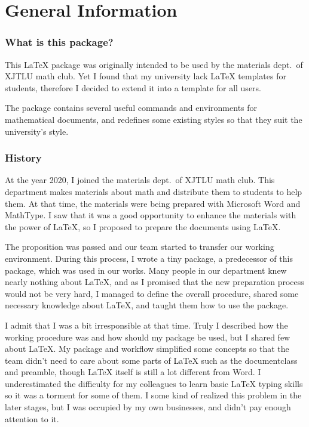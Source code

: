 \part{General Information}
\pagestyle{headings}
\section{What is this package?}
This \LaTeX{} package was originally intended to be used by the materials dept.~of XJTLU math club. Yet I found that my university lack \LaTeX{} templates for students, therefore I decided to extend it into a template for all users.

The package contains several useful commands and environments for mathematical documents, and redefines some existing styles so that they suit the university's style.

\section{History}
At the year 2020, I joined the materials dept.~of XJTLU math club. This department makes materials about math and distribute them to students to help them. At that time, the materials were being prepared with Microsoft Word and MathType. I saw that it was a good opportunity to enhance the materials with the power of \LaTeX, so I proposed to prepare the documents using \LaTeX.

The proposition was passed and our team started to transfer our working environment. During this process, I wrote a tiny package, a predecessor of this package, which was used in our works. Many people in our department knew nearly nothing about \LaTeX, and as I promised that the new preparation process would not be very hard, I managed to define the overall procedure, shared some necessary knowledge about \LaTeX, and taught them how to use the package.

I admit that I was a bit irresponsible at that time. Truly I described how the working procedure was and how should my package be used, but I shared few about \LaTeX. My package and workflow simplified some concepts so that the team didn't need to care about some parts of \LaTeX{} such as the documentclass and preamble, though \LaTeX{} itself is still a lot different from Word. I underestimated the difficulty for my colleagues to learn basic \LaTeX{} typing skills so it was a torment for some of them. I some kind of realized this problem in the later stages, but I was occupied by my own businesses, and didn't pay enough attention to it.

